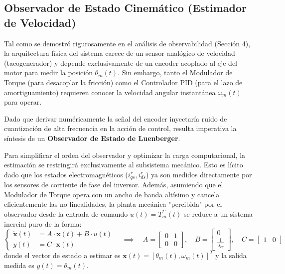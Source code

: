 \documentclass[10pt,a4paper]{article}
\begin{document}

\subsection{Observador de Estado Cinemático (Estimador de Velocidad)}

Tal como se demostró rigurosamente en el análisis de observabilidad (Sección 4), la arquitectura física del sistema carece de un sensor analógico de velocidad (tacogenerador) y depende exclusivamente de un encoder acoplado al eje del motor para medir la posición $\theta_m(t)$. Sin embargo, tanto el Modulador de Torque (para desacoplar la fricción) como el Controlador PID (para el lazo de amortiguamiento) requieren conocer la velocidad angular instantánea $\omega_m(t)$ para operar.

Dado que derivar numéricamente la señal del encoder inyectaría ruido de cuantización de alta frecuencia en la acción de control, resulta imperativa la síntesis de un \textbf{Observador de Estado de Luenberger}. 

Para simplificar el orden del observador y optimizar la carga computacional, la estimación se restringirá exclusivamente al subsistema mecánico. Esto es lícito dado que los estados electromagnéticos ($i_{qs}^r, i_{ds}^r$) ya son medidos directamente por los sensores de corriente de fase del inversor. Además, asumiendo que el Modulador de Torque opera con un ancho de banda altísimo y cancela eficientemente las no linealidades, la planta mecánica "percibida" por el observador desde la entrada de comando $u(t) = T_m^{*\prime}(t)$ se reduce a un sistema inercial puro de la forma:
\begin{equation*}
    \left\{
    \begin{aligned}
        \dot{\mathbf{x}}(t) &= A \cdot \mathbf{x}(t) + B \cdot u(t) \\
        y(t) &= C \cdot \mathbf{x}(t)
    \end{aligned}
    \right.
    \quad \implies \quad
    A = \begin{bmatrix} 0 & 1 \\ 0 & 0 \end{bmatrix}, \quad 
    B = \begin{bmatrix} 0 \\ \frac{1}{J_{eq}} \end{bmatrix}, \quad 
    C = \begin{bmatrix} 1 & 0 \end{bmatrix}
\end{equation*}
donde el vector de estado a estimar es $\mathbf{x}(t) = [\theta_m(t), \omega_m(t)]^T$ y la salida medida es $y(t) = \theta_m(t)$.
\end{document}
